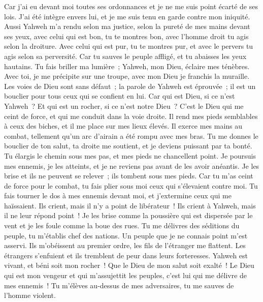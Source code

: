 \begin{multicols}{2}
Car j'ai eu devant moi toutes ses ordonnances et je ne me suis point écarté de ses lois.
J'ai été intègre envers lui, et je me suis tenu en garde contre mon iniquité.
Aussi Yahweh m'a rendu selon ma justice, selon la pureté de mes mains devant ses yeux,
avec celui qui est bon, tu te montres bon, avec l'homme droit tu agis selon la droiture.
Avec celui qui est pur, tu te montres pur, et avec le pervers tu agis selon sa perversité.
Car tu sauves le peuple affligé, et tu abaisses les yeux hautains.
Tu fais briller ma lumière~; Yahweh, mon Dieu, éclaire mes ténèbres.
Avec toi, je me précipite sur une troupe, avec mon Dieu je franchis la muraille.
Les voies de Dieu sont sans défaut~; la parole de Yahweh est éprouvée~; il est un bouclier pour tous ceux qui se confient en lui.
Car qui est Dieu, si ce n'est Yahweh~? Et qui est un rocher, si ce n'est notre Dieu~?
C'est le Dieu qui me ceint de force, et qui me conduit dans la voie droite.
Il rend mes pieds semblables à ceux des biches, et il me place sur mes lieux élevés.
Il exerce mes mains au combat, tellement qu'un arc d'airain a été rompu avec mes bras.
Tu me donnes le bouclier de ton salut, ta droite me soutient, et je deviens puissant par ta bonté.
Tu élargis le chemin sous mes pas, et mes pieds ne chancellent point.
Je poursuis mes ennemis, je les atteints, et je ne reviens pas avant de les avoir anéantis.
Je les brise et ils ne peuvent se relever~; ils tombent sous mes pieds.
Car tu m'as ceint de force pour le combat, tu fais plier sous moi ceux qui s'élevaient contre moi.
Tu fais tourner le dos à mes ennemis devant moi, et j'extermine ceux qui me haïssaient.
Ils crient, mais il n'y a point de libérateur~! Ils crient à Yahweh, mais il ne leur répond point~!
Je les brise comme la poussière qui est dispersée par le vent et je les foule comme la boue des rues.
Tu me délivres des séditions du peuple, tu m'établis chef des nations. Un peuple que je ne connais point m'est asservi.
Ils m'obéissent au premier ordre, les fils de l'étranger me flattent.
Les étrangers s'enfuient et ils tremblent de peur dans leurs forteresses.
Yahweh est vivant, et béni soit mon rocher~! Que le Dieu de mon salut soit exalté~!
Le Dieu qui est mon vengeur et qui m'assujettit les peuples,
c'est lui qui me délivre de mes ennemis~! Tu m'élèves au-dessus de mes adversaires, tu me sauves de l'homme violent.

\end{multicols}
